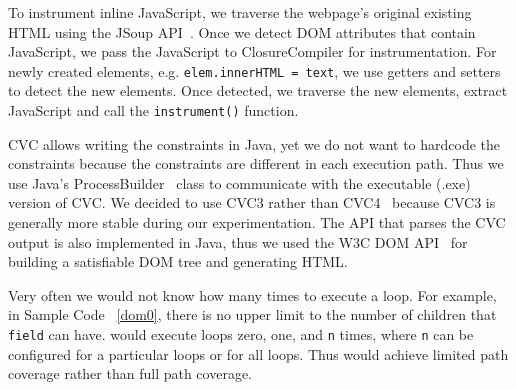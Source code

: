 To instrument inline JavaScript, we traverse the webpage's original existing HTML using the JSoup API~\cite{jsoup}.  Once we detect DOM attributes that contain JavaScript, we pass the JavaScript to ClosureCompiler for instrumentation.  
For newly created elements, e.g. {\tt elem.innerHTML = text}, we use getters and setters to detect the new elements.  
Once detected, we traverse the new elements, extract JavaScript and call the {\tt instrument()} function.  


CVC allows writing the constraints in Java, yet we do not want to hardcode the constraints because the constraints are different in each execution path.  
Thus we use Java's ProcessBuilder~\cite{processbuilder} class to communicate with the executable (.exe) version of CVC.  We decided to use CVC3 rather than CVC4~\cite{cvc4} because CVC3 is generally more stable during our experimentation.  
The API that parses the CVC output is also implemented in Java, thus we used the W3C DOM API~\cite{DomAPI} for building a satisfiable DOM tree and generating HTML.  


Very often we would not know how many times to execute a loop.  For example, in Sample Code ~\ref{dom0}, there is no upper limit to the number of children that {\tt field} can have.  
\tool would execute loops zero, one, and {\tt n} times, where {\tt n} can be configured for a particular loops or for all loops.  Thus \tool would achieve limited path coverage rather than full path coverage.  




